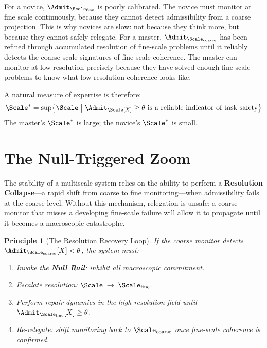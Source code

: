 \documentclass[11pt,oneside]{book}
\newtheorem{principle}{Principle}[chapter]
\begin{document}
For a novice, $\Admit_{\Scale_{\mathrm{fine}}}$ is poorly calibrated. The novice must monitor at fine scale continuously, because they cannot detect admissibility from a coarse projection. This is why novices are slow: not because they think more, but because they cannot safely relegate. For a master, $\Admit_{\Scale_{\mathrm{coarse}}}$ has been refined through accumulated resolution of fine-scale problems until it reliably detects the coarse-scale signatures of fine-scale coherence. The master can monitor at low resolution precisely because they have solved enough fine-scale problems to know what low-resolution coherence looks like.

A natural measure of expertise is therefore:
\begin{equation}
    \Scale^* = \sup\bigl\{ \Scale \;\big|\; \Admit_\Scale[X] \ge \theta \text{ is a reliable indicator of task safety}\bigr\}
\end{equation}
The master's $\Scale^*$ is large; the novice's $\Scale^*$ is small.

\section{The Null-Triggered Zoom}

The stability of a multiscale system relies on the ability to perform a \textbf{Resolution Collapse}---a rapid shift from coarse to fine monitoring---when admissibility fails at the coarse level. Without this mechanism, relegation is unsafe: a coarse monitor that misses a developing fine-scale failure will allow it to propagate until it becomes a macroscopic catastrophe.

\begin{principle}[The Resolution Recovery Loop]
If the coarse monitor detects $\Admit_{\Scale_{\mathrm{coarse}}}[X] < \theta$, the system must:
\begin{enumerate}
    \item Invoke the \textbf{Null Rail}: inhibit all macroscopic commitment.
    \item Escalate resolution: $\Scale \;\rightarrow\; \Scale_{\mathrm{fine}}$.
    \item Perform repair dynamics in the high-resolution field until $\Admit_{\Scale_{\mathrm{fine}}}[X] \ge \theta$.
    \item Re-relegate: shift monitoring back to $\Scale_{\mathrm{coarse}}$ once fine-scale coherence is confirmed.
\end{enumerate}
\end{principle}
\end{document}
